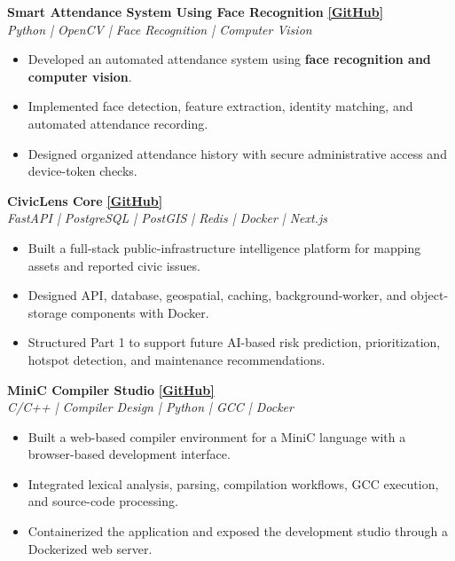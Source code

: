 \documentclass[10pt,a4paper]{article}
\newcommand{\resumeProject}[3]{
    \textbf{#1}
    \hfill
    \href{#3}{\textbf{[GitHub]}}
    \\
    \textit{#2}
    \vspace{1pt}
}
\newcommand{\resumeProjectEnd}{
    \vspace{3pt}
}
\begin{document}
\resumeProject
{Smart Attendance System Using Face Recognition}
{Python | OpenCV | Face Recognition | Computer Vision}
{https://github.com/BijoySarkar19/smart-attendance-system}

\begin{itemize}[leftmargin=14pt, itemsep=1pt, topsep=1pt]
    \item Developed an automated attendance system using \textbf{face recognition and computer vision}.
    \item Implemented face detection, feature extraction, identity matching, and automated attendance recording.
    \item Designed organized attendance history with secure administrative access and device-token checks.
\end{itemize}
\resumeProjectEnd

\resumeProject
{CivicLens Core}
{FastAPI | PostgreSQL | PostGIS | Redis | Docker | Next.js}
{https://github.com/BijoySarkar19/CivicLens-Core.git}

\begin{itemize}[leftmargin=14pt, itemsep=1pt, topsep=1pt]
    \item Built a full-stack public-infrastructure intelligence platform for mapping assets and reported civic issues.
    \item Designed API, database, geospatial, caching, background-worker, and object-storage components with Docker.
    \item Structured Part 1 to support future AI-based risk prediction, prioritization, hotspot detection, and maintenance recommendations.
\end{itemize}
\resumeProjectEnd

\resumeProject
{MiniC Compiler Studio}
{C/C++ | Compiler Design | Python | GCC | Docker}
{https://github.com/BijoySarkar19/c-compiler-studio}

\begin{itemize}[leftmargin=14pt, itemsep=1pt, topsep=1pt]
    \item Built a web-based compiler environment for a MiniC language with a browser-based development interface.
    \item Integrated lexical analysis, parsing, compilation workflows, GCC execution, and source-code processing.
    \item Containerized the application and exposed the development studio through a Dockerized web server.
\end{itemize}
\resumeProjectEnd
\end{document}
